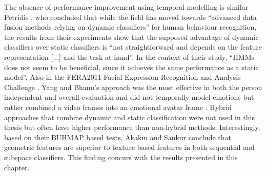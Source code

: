 The absence of performance improvement using temporal modelling is similar Petridis \etal \cite{Petridis2009}, who concluded that while the field has moved towards ``advanced data fusion methods relying on dynamic classifiers'' for human behaviour recognition, the results from their experiments show that the supposed advantage of dynamic classifiers over static classifiers is ``not straightforward and depends on the feature representation [...] and the task at hand''. In the context of their study, ``HMMs does not seem to be beneficial, since it achieves the same performance as a static model''.
Also in the FERA2011 Facial Expression Recognition and Analysis Challenge \cite{Valstar2011}, Yang and Bhanu's approach was the most effective in both the person independent and overall evaluation and did not temporally model emotions but rather combined a video frames into an emotional avatar frame \cite{Yang2011}.
Hybrid approaches that combine dynamic and static classification were not used in this thesis but often have higher performance than non-hybrid methods. 
Interestingly, based on their BUHMAP based tests, Akak{\i}n and Sankur conclude that geometric features are superior to texture based features in both sequential and subspace classifiers. This finding concurs with the results presented in this chapter. 
